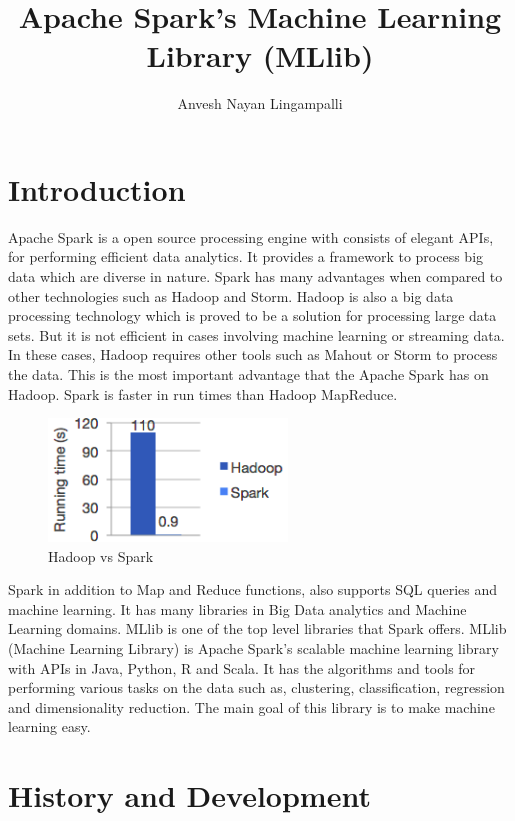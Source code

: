 \documentclass[9pt,twocolumn,twoside]{styles/osajnl}
\title{Apache Spark's Machine Learning Library (MLlib)}
\author[1]{Anvesh Nayan Lingampalli}
\affil[1]{School of Informatics and Computing, Bloomington, IN 47408, U.S.A.}
\affil[*]{Corresponding authors: anveling@umail.iu.edu}
\begin{document}
\maketitle

\section{Introduction}

Apache Spark is a open source processing engine with consists of
elegant APIs, for performing efficient data analytics. It provides a
framework to process big data which are diverse in nature. Spark has
many advantages when compared to other technologies such as Hadoop and
Storm. Hadoop is also a big data processing technology which is proved
to be a solution for processing large data sets. But it is not
efficient in cases involving machine learning or streaming data. In
these cases, Hadoop requires other tools such as Mahout or Storm to
process the data. This is the most important advantage that the Apache
Spark has on Hadoop. Spark is faster in run times than Hadoop
MapReduce.\cite{MLlib-webpage}

\begin{figure}[htbp]
\begin{center}
\centering
\includegraphics[width= 2.5in]{images/hadoopvspark}
\caption{Hadoop vs Spark}
\label{fig:false-color}
\end{center}
\end{figure}

Spark in addition to Map and Reduce functions, also supports SQL
queries and machine learning. It has many libraries in Big Data
analytics and Machine Learning domains. MLlib is one of the top level
libraries that Spark offers.  MLlib (Machine Learning Library) is
Apache Spark’s scalable machine learning library with APIs in Java,
Python, R and Scala. It has the algorithms and tools for performing
various tasks on the data such as, clustering, classification,
regression and dimensionality reduction. The main goal of this library
is to make machine learning easy.

\section{History and Development}
\end{document}
